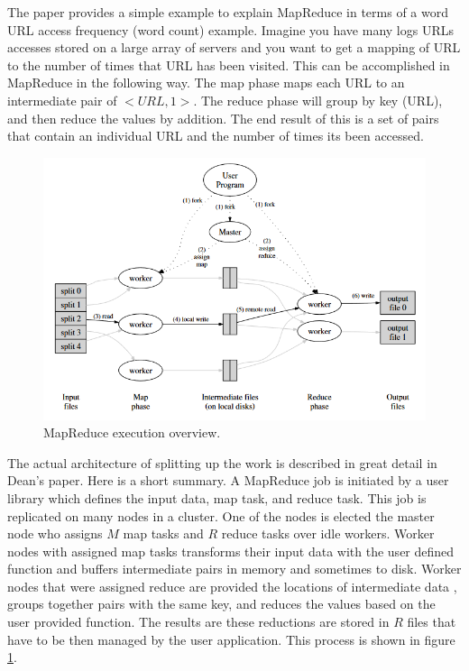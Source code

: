 \documentclass[]{article}
\begin{document}
The paper provides a simple example to explain MapReduce in terms of a word URL access frequency (word count) example. Imagine you have many logs URLs accesses stored on a large array of servers and you want to get a mapping of URL to the number of times that URL has been visited. This can be accomplished in MapReduce in the following way. The map phase maps each URL to an intermediate pair of $<URL, 1>$. The reduce phase will group by key (URL), and then reduce the values by addition. The end result of this is a set of pairs that contain an individual URL and the number of times its been accessed.

\begin{figure}
    \centering
    \includegraphics[width=1.0\linewidth]{img/mr-execution}
    \caption[MapReduce execution overview.]{MapReduce execution overview. \cite{dean2008mapreduce}}
    \label{fig:mr-execution}
\end{figure}

The actual architecture of splitting up the work is described in great detail in Dean's paper. Here is a short summary. A MapReduce job is initiated by a user library which defines the input data, map task, and reduce task. This job is replicated on many nodes in a cluster. One of the nodes is elected the master node who assigns $M$ map tasks and $R$ reduce tasks over idle workers. Worker nodes with assigned map tasks transforms their input data with the user defined function and buffers intermediate pairs in memory and sometimes to disk. Worker nodes that were assigned reduce are provided the locations of intermediate data , groups together pairs with the same key, and reduces the values based on the user provided function. The results are these reductions are stored in $R$ files that have to be then managed by the user application. This process is shown in figure \ref{fig:mr-execution}.
\end{document}
